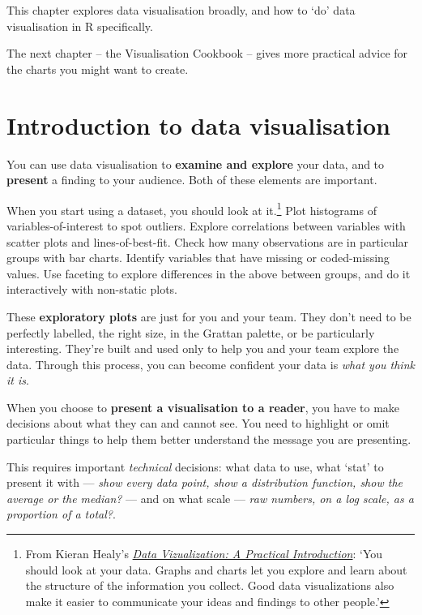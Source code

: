 \documentclass[]{book}
\begin{document}
This chapter explores data visualisation broadly, and how to `do' data visualisation in R specifically.

The next chapter -- the Visualisation Cookbook -- gives more practical advice for the charts you might want to create.

\hypertarget{introduction-to-data-visualisation}{%
\section{Introduction to data visualisation}\label{introduction-to-data-visualisation}}

You can use data visualisation to \textbf{examine and explore} your data, and to \textbf{present} a finding to your audience. Both of these elements are important.

When you start using a dataset, you should look at it.\footnote{From Kieran Healy's \href{https://socviz.co/}{\emph{Data Vizualization: A Practical Introduction}}: `You should look at your data. Graphs and charts let you explore and learn about the structure of the information you collect. Good data visualizations also make it easier to communicate your ideas and findings to other people.'} Plot histograms of variables-of-interest to spot outliers. Explore correlations between variables with scatter plots and lines-of-best-fit. Check how many observations are in particular groups with bar charts. Identify variables that have missing or coded-missing values. Use faceting to explore differences in the above between groups, and do it interactively with non-static plots.

These \textbf{exploratory plots} are just for you and your team. They don't need to be perfectly labelled, the right size, in the Grattan palette, or be particularly interesting.
They're built and used only to help you and your team explore the data.
Through this process, you can become confident your data is \emph{what you think it is}.

When you choose to \textbf{present a visualisation to a reader}, you have to make decisions about what they can and cannot see. You need to highlight or omit particular things to help them better understand the message you are presenting.

This requires important \emph{technical} decisions: what data to use, what `stat' to present it with --- \emph{show every data point, show a distribution function, show the average or the median?} --- and on what scale --- \emph{raw numbers, on a log scale, as a proportion of a total?}.
\end{document}
